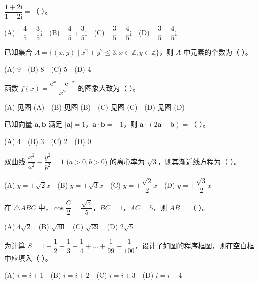 \begin{question}
$\dfrac{1+2\mathrm i}{1-2\mathrm i} =$（ ）。

(A) $-\dfrac45-\dfrac35\mathrm i$　(B) $-\dfrac45+\dfrac35\mathrm i$　(C) $-\dfrac35-\dfrac45\mathrm i$　(D) $-\dfrac35+\dfrac45\mathrm i$

\end{question}
\begin{question}
已知集合 $A=\{(x,y)\mid x^2+y^2\leqslant 3, x\in\mathbb Z, y\in\mathbb Z\}$，则 $A$ 中元素的个数为（ ）。

(A) 9　(B) 8　(C) 5　(D) 4

\Needspace{0.4\textheight}
\end{question}
\begin{question}
函数 $f(x)=\dfrac{\mathrm e^x-\mathrm e^{-x}}{x^2}$ 的图象大致为（ ）。
\nopagebreak[4]
\begin{center}\end{center}
\nopagebreak[4]
(A) 见图 (A)　(B) 见图 (B)　(C) 见图 (C)　(D) 见图 (D)

\end{question}
\begin{question}
已知向量 $\boldsymbol a, \boldsymbol b$ 满足 $|\boldsymbol a|=1$，$\boldsymbol a\cdot\boldsymbol b=-1$，则 $\boldsymbol a\cdot(2\boldsymbol a-\boldsymbol b)=$（ ）。

(A) 4　(B) 3　(C) 2　(D) 0

\end{question}
\begin{question}
双曲线 $\dfrac{x^2}{a^2}-\dfrac{y^2}{b^2}=1$ ($a>0, b>0$) 的离心率为 $\sqrt3$，则其渐近线方程为（ ）。

(A) $y=\pm\sqrt2 x$　(B) $y=\pm\sqrt3 x$　(C) $y=\pm\dfrac{\sqrt2}{2}x$　(D) $y=\pm\dfrac{\sqrt3}{2}x$

\end{question}
\begin{question}
在 $\triangle ABC$ 中，$\cos\dfrac C2 = \dfrac{\sqrt5}{5}$，$BC=1$，$AC=5$，则 $AB=$（ ）。

(A) $4\sqrt2$　(B) $\sqrt{30}$　(C) $\sqrt{29}$　(D) $2\sqrt5$

\Needspace{0.4\textheight}
\end{question}
\begin{question}
为计算 $S=1-\dfrac12+\dfrac13-\dfrac14+\dots+\dfrac{1}{99}-\dfrac{1}{100}$，设计了如图的程序框图，则在空白框中应填入（ ）。
\nopagebreak[4]
\begin{center}\end{center}
\nopagebreak[4]
(A) $i=i+1$　(B) $i=i+2$　(C) $i=i+3$　(D) $i=i+4$

\end{question}
